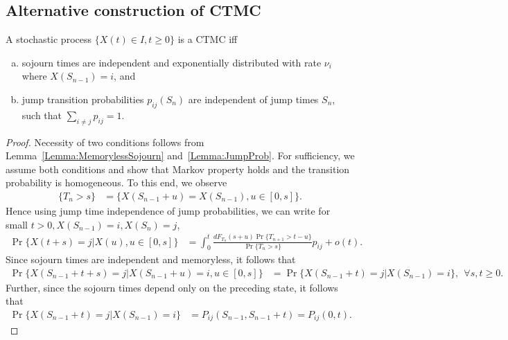 \documentclass[a4paper,10pt,english]{article}
\begin{document}
\subsection{Alternative construction of CTMC}
\begin{prop} A stochastic process $\{X(t) \in I, t \geqslant 0 \}$ is a CTMC iff 
\begin{enumerate}[a.]
\item sojourn times are independent and exponentially distributed with rate $\nu_i$ where $X(S_{n-1}) = i$, and 
\item jump transition probabilities $p_{ij}(S_n)$ are independent of jump times $S_n$, such that $\sum_{i \neq j}p_{ij}=1$.
\end{enumerate}
\end{prop}
\begin{proof}
Necessity of two conditions follows from Lemma~\ref{Lemma:MemorylessSojourn} and~\ref{Lemma:JumpProb}. 
For sufficiency, we assume both conditions and show that Markov property holds and the transition probability is homogeneous. 
To this end, we observe
\begin{align*}
\{ T_n > s \} &= \{ X(S_{n-1}+ u) = X(S_{n-1}), u \in [0,s] \}.
\end{align*}
Hence using jump time independence of jump probabilities, we can write for small $t > 0, X(S_{n-1})=i, X(S_{n}) = j$, 
\begin{align*}
\Pr\{ X(t+s) = j | X(u), u \in [0,s] \} 
&= \int_0^{t}\frac{dF_{T_n}(s+u)\Pr\{T_{n+1} > t-u\}}{\Pr\{T_n> s\}}p_{ij} + o(t).
\end{align*}
Since sojourn times are independent and memoryless, it follows that
\begin{align*}
\Pr\{ X(S_{n-1} +t+s) = j | X(S_{n-1}+u) = i, u \in [0,s] \} 
&= \Pr\{X(S_{n-1}+t) = j | X(S_{n-1}) = i\}, ~~\forall s, t \geqslant 0.
\end{align*}
Further, since the sojourn times depend only on the preceding state, it follows that 
\begin{align*}
\Pr\{X(S_{n-1}+t) = j | X(S_{n-1}) = i\} &= P_{ij}(S_{n-1},S_{n-1}+t) = P_{ij}(0,t).%
\end{align*}
\end{proof}
\end{document}
